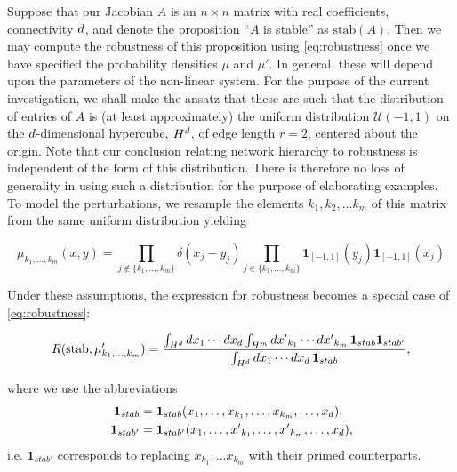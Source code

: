 Suppose that our Jacobian $A$ is an $n \times n$ matrix with real coefficients, connectivity $d$, and denote the proposition ``$A$ is stable'' as $\mathrm{stab}(A)$.  Then we may compute the robustness of this proposition using \ref{eq:robustness} once we have specified the probability densities $\mu$ and $\mu'$.  In general, these will depend upon the parameters of the non-linear system.  For the purpose of the current investigation, we shall make the ansatz that these are such that the distribution of entries of $A$ is (at least approximately) the uniform distribution $\mathcal{U}(-1,1)$ on the $d$-dimensional hypercube, $H^d$, of edge length $r=2$, centered about the origin. Note that our conclusion relating network hierarchy to robustness is independent of the form of this distribution. There is therefore no loss of generality in using such a distribution for the purpose of elaborating examples. To model the perturbations, we resample the elements $k_1, k_2, \ldots k_m$ of this matrix from the same uniform distribution yielding
\begin{widetext}
$$
\mu_{k_1,\ldots,k_m}(x,y) = \prod_{j \notin \{k_1, \ldots, k_m\} } \delta(x_j-y_j) \prod_{j \in \{k_1,\ldots,k_m\}} \mathbf{1}_{[-1,1]} (y_j) \mathbf{1}_{[-1,1]} (x_j)
$$
\end{widetext}
Under these assumptions, the expression for robustness becomes a special case of \ref{eq:robustness}:
\begin{widetext}
\begin{equation}\label{eq:condprobgen}
 R (\mathrm{stab}, \mu'_{k_1, \ldots, k_m}) =
  \frac{\int_{H^d} dx_1 \cdots dx_d \int_{H^m} {dx'}_{k_1} \cdots {dx'}_{k_m}\,
    \mathbf{1}_{stab} \mathbf{1}_{stab'}}
  {\int_{H^d} dx_1 \cdots dx_d  \, \mathbf{1}_{stab}},
\end{equation}
\end{widetext}
where we use the abbreviations
\begin{align*}
\mathbf{1}_{stab} &= \mathbf{1}_{stab}(x_1, \ldots, x_{k_1}, \ldots, x_{k_m}, \ldots, x_d), \\
\mathbf{1}_{stab'} &= \mathbf{1}_{stab'}(x_1, \ldots, {x'}_{k_1}, \ldots, {x'}_{k_m},  \ldots, x_d),
\end{align*}
i.e. $\mathbf{1}_{stab'}$ corresponds to replacing $x_{k_1}, \ldots x_{k_m}$ with their primed counterparts.


